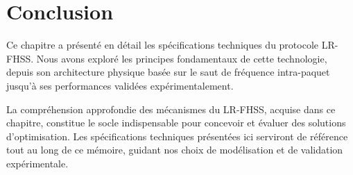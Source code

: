 \section{Conclusion}

Ce chapitre a présenté en détail les spécifications techniques du protocole LR-FHSS. Nous avons exploré les principes fondamentaux de cette technologie, depuis son architecture physique basée sur le saut de fréquence intra-paquet jusqu'à ses performances validées expérimentalement.

La compréhension approfondie des mécanismes du LR-FHSS, acquise dans ce chapitre, constitue le socle indispensable pour concevoir et évaluer des solutions d'optimisation. Les spécifications techniques présentées ici serviront de référence tout au long de ce mémoire, guidant nos choix de modélisation et de validation expérimentale.
